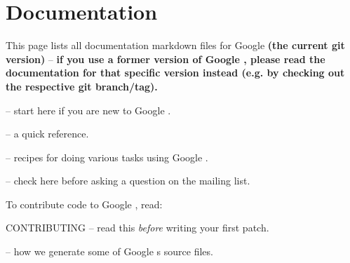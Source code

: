 \chapter{Documentation}
\hypertarget{md_libraries_2fc_2include_2fc_2crypto_2webauthn__json_2thirdparty_2gtest_2googlemock_2docs_2_documentation}{}\label{md_libraries_2fc_2include_2fc_2crypto_2webauthn__json_2thirdparty_2gtest_2googlemock_2docs_2_documentation}
This page lists all documentation markdown files for Google  {\bfseries{(the current git version)}} -- {\bfseries{if you use a former version of Google , please read the documentation for that specific version instead (e.\+g. by checking out the respective git branch/tag).}}


\begin{DoxyItemize}
\item {} -- start here if you are new to Google .
\item {} -- a quick reference.
\item {} -- recipes for doing various tasks using Google .
\item {} -- check here before asking a question on the mailing list.
\end{DoxyItemize}

To contribute code to Google , read\+:


\begin{DoxyItemize}
\item CONTRIBUTING -- read this {\itshape before} writing your first patch.
\item {} -- how we generate some of Google \textquotesingle{}s source files. 
\end{DoxyItemize}